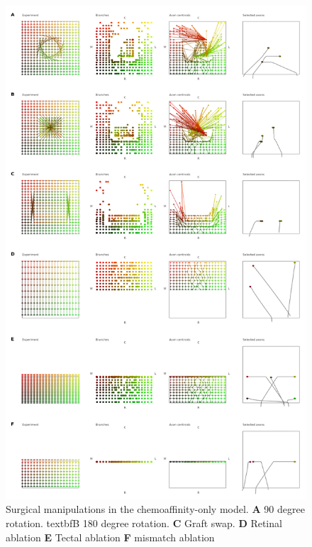 \documentclass[11pt, a4paper]{article}
\begin{document}
%
%
\begin{figure}
\includegraphics[width=0.95\linewidth]{./images/fig_chemo_manipulations.png}
\caption{Surgical manipulations in the chemoaffinity-only model. \textbf{A} 90 degree
rotation. textbf{B} 180 degree rotation. \textbf{C} Graft swap. \textbf{D}
Retinal ablation \textbf{E} Tectal ablation \textbf{F} mismatch ablation}
\label{f:chsurg}
\end{figure}
\end{document}
